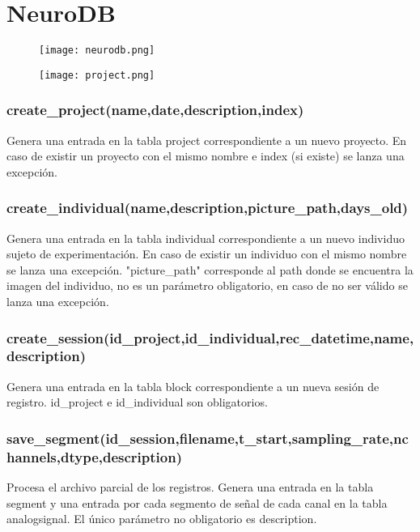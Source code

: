 \documentclass[12pt]{article}
\numberwithin{equation}{section}
\numberwithin{figure}{section}
\numberwithin{table}{section}
\begin{document}
\section{NeuroDB}

\begin{figure}[H]
	\centering
	\texttt{[image: neurodb.png]}
	\caption{}
	\label{fig:neurodb}
\end{figure}



\begin{figure}[H]
	\centering
	\texttt{[image: project.png]}
	\caption{}
	\label{fig:neurodb}
\end{figure}

\subsubsection*{create\_project(name,date,description,index)}
Genera una entrada en la tabla project correspondiente a un nuevo proyecto. En caso de existir un proyecto con el mismo nombre e index (si existe) se lanza una excepción.

\subsubsection*{create\_individual(name,description,picture\_path,days\_old)}
Genera una entrada en la tabla individual correspondiente a un nuevo individuo sujeto de experimentación. En caso de existir un individuo con el mismo nombre se lanza una excepción. "picture\_path" corresponde al path donde se encuentra la imagen del individuo, no es un parámetro obligatorio, en caso de no ser válido se lanza una excepción.

\subsubsection*{create\_session(id\_project,id\_individual,rec\_datetime,name,description)}
Genera una entrada en la tabla block correspondiente a un nueva sesión de registro.
id\_project e id\_individual son obligatorios.

\subsubsection*{save\_segment(id\_session,filename,t\_start,sampling\_rate,nchannels,dtype,description)}
Procesa el archivo parcial de los registros. Genera una entrada en la tabla segment y una entrada por cada segmento de señal de cada canal en la tabla analogsignal. El único parámetro no obligatorio es description.
\end{document}

